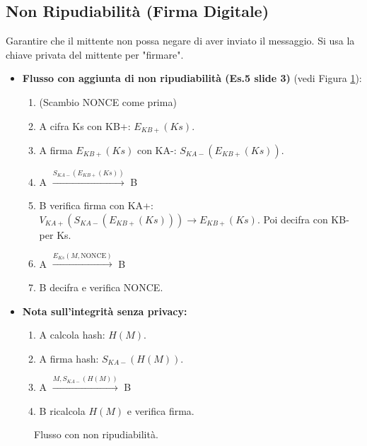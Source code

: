 \subsection{Non Ripudiabilità (Firma Digitale)}
Garantire che il mittente non possa negare di aver inviato il messaggio. Si usa la chiave privata del mittente per "firmare".
\begin{itemize}
    \item \textbf{Flusso con aggiunta di non ripudiabilità (Es.5 slide 3)} (vedi Figura \ref{fig:nonrep_flow}):
    \begin{enumerate}
        \item (Scambio NONCE come prima)
        \item A cifra Ks con KB+: $E_{KB+}(Ks)$.
        \item A firma $E_{KB+}(Ks)$ con KA-: $S_{KA-}(E_{KB+}(Ks))$.
        \item A $\xrightarrow{S_{KA-}(E_{KB+}(Ks))}$ B
        \item B verifica firma con KA+: $V_{KA+}(S_{KA-}(E_{KB+}(Ks))) \rightarrow E_{KB+}(Ks)$. Poi decifra con KB- per Ks.
        \item A $\xrightarrow{E_{Ks}(M, \text{NONCE})}$ B
        \item B decifra e verifica NONCE.
    \end{enumerate}
    \item \textbf{Nota sull'integrità senza privacy:}
    \begin{enumerate}
        \item A calcola hash: $H(M)$.
        \item A firma hash: $S_{KA-}(H(M))$.
        \item A $\xrightarrow{M, S_{KA-}(H(M))}$ B
        \item B ricalcola $H(M)$ e verifica firma.
    \end{enumerate}
\end{itemize}

\begin{figure}[H]
\centering
{}
\caption{Flusso con non ripudiabilità.}
\label{fig:nonrep_flow}
\end{figure}

